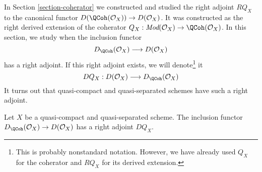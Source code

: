 \noindent
In Section \ref{section-coherator} we constructed and studied
the right adjoint $RQ_X$ to the canonical functor
$D(\QCoh(\mathcal{O}_X)) \to D(\mathcal{O}_X)$.
It was constructed as the right derived extension of the coherator
$Q_X : \textit{Mod}(\mathcal{O}_X) \to \QCoh(\mathcal{O}_X)$.
In this section, we study when the inclusion functor
$$
D_\QCoh(\mathcal{O}_X) \longrightarrow D(\mathcal{O}_X)
$$
has a right adjoint. If this right adjoint exists, we will
denote\footnote{This is probably nonstandard notation. However, we have already
used $Q_X$ for the coherator and $RQ_X$ for its derived extension.} it
$$
DQ_X :
D(\mathcal{O}_X) \longrightarrow D_\QCoh(\mathcal{O}_X)
$$
It turns out that quasi-compact and quasi-separated
schemes have such a right adjoint.

\begin{lemma}
\label{lemma-better-coherator}
Let $X$ be a quasi-compact and quasi-separated scheme.
The inclusion functor $D_\QCoh(\mathcal{O}_X) \to D(\mathcal{O}_X)$
has a right adjoint $DQ_X$.
\end{lemma}

